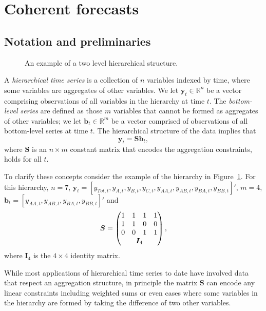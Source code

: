 \documentclass[12pt]{article}
\theoremstyle{definition}
\begin{document}
\section{Coherent forecasts}\label{sec:CoheForecasts}
	
	\subsection{Notation and preliminaries}\label{sec:notation}
	
		\begin{figure}[H]
			\begin{center}
				 
				 
				\qobitree
			\end{center}
			\caption{An example of a two level hierarchical structure.}\label{fig1}
		\end{figure}
	
	
	A \emph{hierarchical time series} is a collection of $n$ variables indexed by time, where some variables are aggregates of other variables. We let $\bm{y}_t \in \mathbb{R}^n$ be a vector comprising observations of all variables in the hierarchy at time $t$. The \emph{bottom-level series} are defined as those $m$ variables that cannot be formed as aggregates of other variables; we let $\bm{b}_t \in \mathbb{R}^m$ be a vector comprised of observations of all bottom-level series at time $t$.  The hierarchical structure of the data implies that 
	\begin{equation}
	\bm{y}_t = \bm{Sb}_t,
	\end{equation}
	where $\bm{S}$ is an $n \times m$ constant matrix that encodes the aggregation constraints, holds for all $t$.  
	
	To clarify these concepts consider the example of the hierarchy in Figure~\ref{fig1}.  For this hierarchy, $n=7$, $\bm{y}_t = [y_{Tot,t},y_{A,t}, y_{B,t},y_{C,t},y_{AA,t}, y_{AB,t}, y_{BA,t}, y_{BB,t}]'$, $m=4$, $\bm{b}_t = [y_{AA,t}, y_{AB,t}, y_{BA,t}, y_{BB,t}]'$ and
	\[
	\bm{S} = \begin{pmatrix}
	1 & 1 & 1 & 1  \\
	1 & 1 & 0 & 0 \\
	0 & 0 & 1 & 1 \\
	& \multicolumn{2}{c}{\bm{I}_4} &
	\end{pmatrix},
	\]
	where $\bm{I}_4$ is the $4\times 4$ identity matrix.
	
	While most applications of hierarchical time series to date have involved data that respect an aggregation structure, in principle the matrix ${\bm S}$ can encode any linear constraints including weighted sums or even cases where some variables in the hierarchy are formed by taking the difference of two other variables.
	
\end{document}
